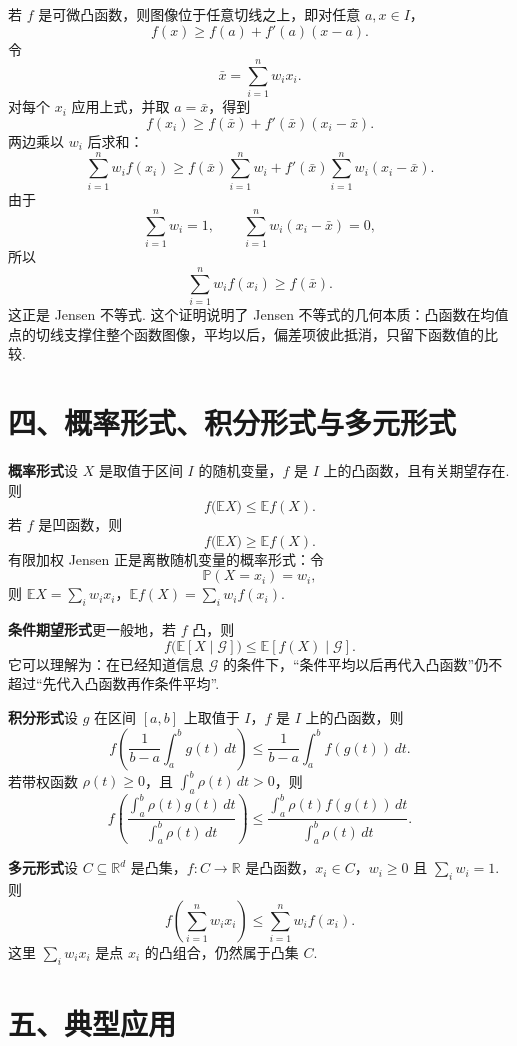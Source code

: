 \documentclass[UTF8,12pt,a4paper,fontset=fandol]{ctexart}
\begin{document}
若 $f$ 是可微凸函数，则图像位于任意切线之上，即对任意 $a,x\in I$，
\[
  f(x)\ge f(a)+f'(a)(x-a).
\]
令
\[
  \bar x=\sum_{i=1}^n w_i x_i.
\]
对每个 $x_i$ 应用上式，并取 $a=\bar x$，得到
\[
  f(x_i)\ge f(\bar x)+f'(\bar x)(x_i-\bar x).
\]
两边乘以 $w_i$ 后求和：
\[
  \sum_{i=1}^n w_if(x_i)
  \ge
  f(\bar x)\sum_{i=1}^n w_i
  +f'(\bar x)\sum_{i=1}^n w_i(x_i-\bar x).
\]
由于
\[
  \sum_{i=1}^n w_i=1,\qquad
  \sum_{i=1}^n w_i(x_i-\bar x)=0,
\]
所以
\[
  \sum_{i=1}^n w_if(x_i)\ge f(\bar x).
\]
这正是 Jensen 不等式. 这个证明说明了 Jensen 不等式的几何本质：凸函数在均值点的切线支撑住整个函数图像，平均以后，偏差项彼此抵消，只留下函数值的比较.

\section*{四、概率形式、积分形式与多元形式}

\noindent\textbf{概率形式}\quad 设 $X$ 是取值于区间 $I$ 的随机变量，$f$ 是 $I$ 上的凸函数，且有关期望存在. 则
\[
  f\bigl(\mathbb E X\bigr)\le \mathbb E f(X).
\]
若 $f$ 是凹函数，则
\[
  f\bigl(\mathbb E X\bigr)\ge \mathbb E f(X).
\]
有限加权 Jensen 正是离散随机变量的概率形式：令
\[
  \mathbb P(X=x_i)=w_i,
\]
则 $\mathbb E X=\sum_iw_ix_i$，$\mathbb Ef(X)=\sum_iw_if(x_i)$.

\noindent\textbf{条件期望形式}\quad 更一般地，若 $f$ 凸，则
\[
  f\bigl(\mathbb E[X\mid\mathcal G]\bigr)
  \le
  \mathbb E[f(X)\mid\mathcal G].
\]
它可以理解为：在已经知道信息 $\mathcal G$ 的条件下，``条件平均以后再代入凸函数''仍不超过``先代入凸函数再作条件平均''.

\noindent\textbf{积分形式}\quad 设 $g$ 在区间 $[a,b]$ 上取值于 $I$，$f$ 是 $I$ 上的凸函数，则
\[
  f\left(\frac{1}{b-a}\int_a^b g(t)\,dt\right)
  \le
  \frac{1}{b-a}\int_a^b f(g(t))\,dt.
\]
若带权函数 $\rho(t)\ge0$，且 $\int_a^b\rho(t)\,dt>0$，则
\[
  f\left(\frac{\int_a^b \rho(t)g(t)\,dt}{\int_a^b\rho(t)\,dt}\right)
  \le
  \frac{\int_a^b \rho(t)f(g(t))\,dt}{\int_a^b\rho(t)\,dt}.
\]

\noindent\textbf{多元形式}\quad 设 $C\subseteq\mathbb R^d$ 是凸集，$f:C\to\mathbb R$ 是凸函数，$x_i\in C$，$w_i\ge0$ 且 $\sum_iw_i=1$. 则
\[
  f\left(\sum_{i=1}^n w_ix_i\right)
  \le
  \sum_{i=1}^n w_if(x_i).
\]
这里 $\sum_iw_ix_i$ 是点 $x_i$ 的凸组合，仍然属于凸集 $C$.

\section*{五、典型应用}
\end{document}
